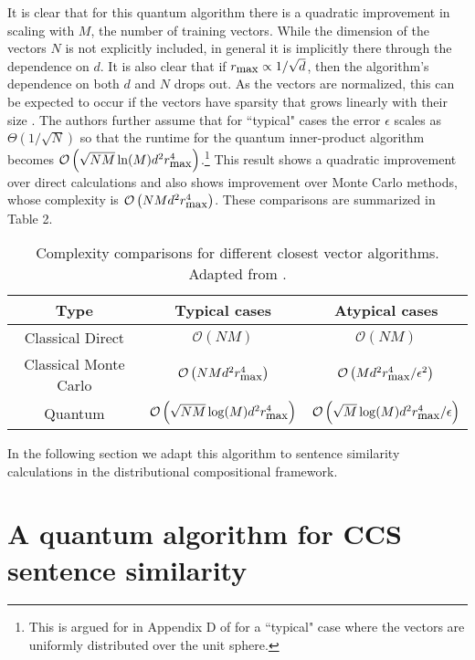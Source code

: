 It is clear that for this quantum algorithm there is a quadratic improvement in scaling with $M$, the number of training vectors. While the dimension of the vectors $N$ is not explicitly included, in general it is implicitly there through the dependence on $d$.  It is also clear that if $r_{\small\mbox{max}}\propto 1/\sqrt{d}$, then the algorithm's dependence on both $d$ and $N$ drops out. As the vectors are normalized, this can be expected to occur if the vectors have sparsity that grows linearly with their size \cite{wiebe2014quantum}. The authors further assume that for ``typical" cases the error $\epsilon$ scales as $\Theta(1/\sqrt{N})$ so that the runtime for the quantum inner-product algorithm becomes $\mathcal{O}\left(\sqrt{NM}\ln(M)d^2r^4_{\small\mbox{max}}\right)$.\footnote{
This is argued for in Appendix D of \cite{wiebe2014quantum} for a ``typical" case where the vectors are uniformly distributed over the unit sphere.} This result shows a quadratic improvement over direct calculations and also shows improvement over Monte Carlo methods, whose complexity is $\mathcal{O}\left(NMd^2r^4_{\small\mbox{max}}\right)$. These comparisons are summarized in Table 2.

\begin{table}[ht]
\label{tab:comp}
\begin{center}
\begin{tabular}{|c|c|c|}\hline
 Type & Typical cases & Atypical cases    \\ \hline
 Classical Direct & $\mathcal{O}(NM)$ & $\mathcal{O}(NM)$ \\
 Classical Monte Carlo & $\mathcal{O}\left(NMd^2r_{\small\mbox{max}}^4\right)$ & $\mathcal{O}\left(Md^2r_{\small\mbox{max}}^4/\epsilon^2\right)$ \\
 Quantum & $\mathcal{O}\left(\sqrt{NM}\log(M)d^2r^4_{\small\mbox{max}}\right)$ &  $\mathcal{O}\left(\sqrt{M}\log(M)d^2r^4_{\small\mbox{max}}/\epsilon\right)$ \\\hline
\end{tabular}
\end{center}
\caption{Complexity comparisons for different closest vector algorithms. Adapted from \cite{wiebe2014quantum}.}
\end{table}

 In the following section we adapt this algorithm to sentence similarity calculations in the distributional compositional framework.

\section{A quantum algorithm for CCS sentence similarity}
\label{sec:discoQalg}

